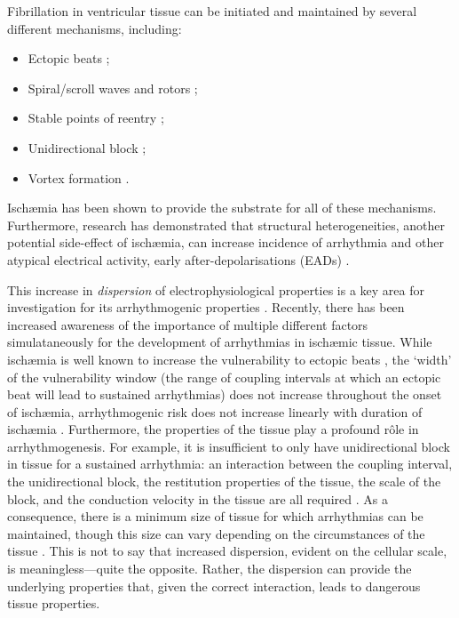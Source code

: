 \documentclass[../thesis-main.tex]{subfiles}
\begin{document}
Fibrillation in ventricular tissue can be initiated and maintained by several different mechanisms, including:
\begin{itemize}
 \item Ectopic beats \citep{Haissaguerre1998, Tobon2010, Zhang2011};
 \item Spiral/scroll waves and rotors \citep{Jalife2003, Jalife2009, Pandit2013};
 \item Stable points of reentry \citep{Mandapati2000, Allessie1977};
 \item Unidirectional block \citep{Allessie1976, Gough1985};
 \item Vortex formation \citep{Cabo1996}.
\end{itemize}
Isch\ae{}mia has been shown to provide the substrate for all of these mechanisms. Furthermore, research has demonstrated that structural heterogeneities, another potential side-effect of isch\ae{}mia, can increase incidence of arrhythmia and other atypical electrical activity, \eg{} early after-depolarisations (EADs) \citep{Auerbach2011}.

This increase in \emph{dispersion} of electrophysiological properties is a key area for investigation for its arrhythmogenic properties \citep{Kuo1983}. Recently, there has been increased awareness of the importance of multiple different factors simulataneously for the development of arrhythmias in isch\ae{}mic tissue. While isch\ae{}mia is well known to increase the vulnerability to ectopic beats \citep{Zhang2011}, the `width' of the vulnerability window (the range of coupling intervals at which an ectopic beat will lead to sustained arrhythmias) does not increase throughout the onset of isch\ae{}mia, \idest{} arrhythmogenic risk does not increase linearly with duration of isch\ae{}mia \citep{Tice2007, Romero2009a, Barrett1997}. Furthermore, the properties of the tissue play a profound r\^ole in arrhythmogenesis. For example, it is insufficient to only have unidirectional block in tissue for a sustained arrhythmia: an interaction between the coupling interval, the unidirectional block, the restitution properties of the tissue, the scale of the block, and the conduction velocity in the tissue are all required \citep{Coronel2009, Cherry2012}. As a consequence, there is a minimum size of tissue for which arrhythmias can be maintained, though this size can vary depending on the circumstances of the tissue \citep{Adeniran2011}. This is not to say that increased dispersion, evident on the cellular scale, is meaningless---quite the opposite. Rather, the dispersion can provide the underlying properties that, given the correct interaction, leads to dangerous tissue properties.
\end{document}
